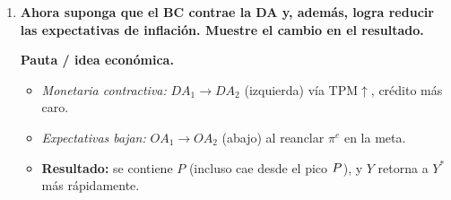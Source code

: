 \documentclass[11pt,addpoints]{article}
\begin{document}
\begin{enumerate}[label=\alph*)]
\vspace{0.4cm}

\item \textbf{Ahora suponga que el BC contrae la DA y, además, logra reducir las expectativas de inflación. Muestre el cambio en el resultado.}

\textbf{Pauta / idea económica.}
\begin{itemize}
\item \emph{Monetaria contractiva:} \(DA_1\to DA_2\) (izquierda) vía TPM\(\uparrow\), crédito más caro.
\item \emph{Expectativas bajan:} \(OA_1\to OA_2\) (abajo) al reanclar \(\pi^e\) en la meta.

\newpage
\vspace*{0.1cm}
\item \textbf{Resultado:} se contiene \(P\) (incluso cae desde el pico \(P^{\*}\)), y \(Y\) retorna a \(Y^*\) más rápidamente.
\end{itemize}


\end{enumerate}
\end{document}
